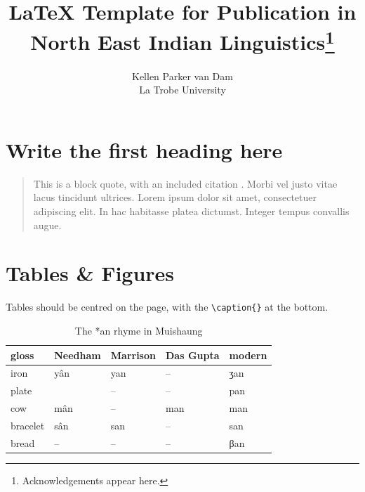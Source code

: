 


\title{LaTeX Template for Publication in North East Indian Linguistics\footnote{Acknowledgements appear here.}}

\author{Kellen Parker van Dam\\La Trobe University}

\maketitle


\section{Write the first heading here}

\lipsum[1]

\begin{quote} %
	This is a block quote, with an included citation \autocite{morey2018verbstemalternation}. Morbi vel justo vitae lacus tincidunt ultrices. Lorem ipsum dolor sit amet, consectetuer adipiscing elit. In hac habitasse platea dictumst. Integer tempus convallis augue.
\end{quote}

\lipsum[5]

\section{Tables \& Figures}

Tables should be centred on the page, with the \texttt{\textbackslash caption\{\}} at the bottom.

\begin{table}[htpb!]
	\centering
	\begin{tabular}{@{}lllll@{}}
	\toprule
	gloss & Needham & Marrison & Das Gupta & modern \\ \midrule
	iron & yân & yan & -- & ʒan \\
	plate &  & -- & -- & pan \\
	cow & mân & -- & man & man \\
	bracelet & sân & san & -- & san \\
	bread & -- & -- & -- & βan \\ \bottomrule
	\end{tabular}
	\caption{The *an rhyme in Muishaung}
	\label{tab:an}
\end{table}

